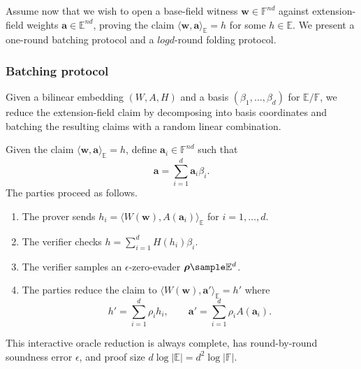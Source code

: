 \documentclass[11pt,letterpaper,usenames,dvipsnames]{article}
\begin{document}
Assume now that we wish to open a base-field witness $\mathbf{w} \in \mathbb{F}^{nd}$ against extension-field weights $\mathbf{a} \in \mathbb{E}^{n d}$, proving the claim $\langle \mathbf{w}, \mathbf{a}\rangle_\mathbb{E} = h$ for some $h \in \mathbb{E}$. We present a one-round batching protocol and a $log d$-round folding protocol.

\subsubsection{Batching protocol}
Given a bilinear embedding $(W, A, H)$ and a basis $(\beta_1, \dots, \beta_d)$ for $\mathbb{E}/\mathbb{F}$, we reduce the extension-field claim by decomposing into basis coordinates and batching     the resulting claims with a random linear combination.

\begin{construction}
Given the claim $\langle \mathbf{w}, \mathbf a\rangle_\mathbb{E}=h$, define $\mathbf{a}_i \in \mathbb{F}^{nd}$ such that 
\[
\mathbf{a} = \sum_{i=1}^d \mathbf{a}_i \beta_i \text{.}
\]
The parties proceed as follows.
\begin{enumerate}
    \item The prover sends $h_i = \langle W(\mathbf{w}), A(\mathbf{a}_i) \rangle_{\mathbb{E}}$  for $i=1,\ldots,d$.
    \item The verifier checks $h = \sum_{i=1}^{d} H(h_i) \beta_i$.
    \item The verifier samples an $\epsilon$-zero-evader $\boldsymbol{\rho} \sample\mathbb E^d$.
    \item The parties reduce the claim to $\langle W(\mathbf{w}), \mathbf a'\rangle_\mathbb{E}=h'$ where 
    \[
    h' = \sum_{i=1}^{d} \rho_i h_i,
    \qquad
    \mathbf{a}' = \sum_{i=1}^{d} \rho_i  A(\mathbf{a}_i) \text{.}
    \]
\end{enumerate}
This interactive oracle reduction is always complete, has round-by-round soundness error $\epsilon$, and proof size $d \log |\mathbb{E}| = d^2 \log |\mathbb{F}|$.
\end{construction}
\end{document}
